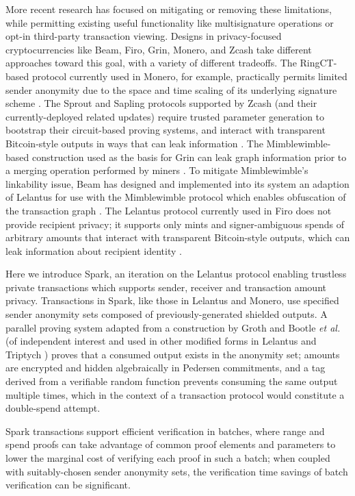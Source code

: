 \documentclass{llncs}
\begin{document}
More recent research has focused on mitigating or removing these limitations, while permitting existing useful functionality like multisignature operations or opt-in third-party transaction viewing.
Designs in privacy-focused cryptocurrencies like Beam, Firo, Grin, Monero, and Zcash take different approaches toward this goal, with a variety of different tradeoffs.
The RingCT-based protocol currently used in Monero, for example, practically permits limited sender anonymity due to the space and time scaling of its underlying signature scheme \cite{ringct,clsag}.
The Sprout and Sapling protocols supported by Zcash \cite{zcash} (and their currently-deployed related updates) require trusted parameter generation to bootstrap their circuit-based proving systems, and interact with transparent Bitcoin-style outputs in ways that can leak information \cite{zcash_sprout,zcash_sapling}.
The Mimblewimble-based construction used as the basis for Grin can leak graph information prior to a merging operation performed by miners \cite{mw}.
To mitigate Mimblewimble's linkability issue, Beam has designed and implemented into its system an adaption of Lelantus for use with the Mimblewimble protocol which enables obfuscation of the transaction graph \cite{LMW}.
The Lelantus protocol currently used in Firo does not provide recipient privacy; it supports only mints and signer-ambiguous spends of arbitrary amounts that interact with transparent Bitcoin-style outputs, which can leak information about recipient identity \cite{lelantus}.

Here we introduce Spark, an iteration on the Lelantus protocol enabling trustless private transactions which supports sender, receiver and transaction amount privacy.
Transactions in Spark, like those in Lelantus and Monero, use specified sender anonymity sets composed of previously-generated shielded outputs.
A parallel proving system adapted from a construction by Groth and Bootle \textit{et al.} \cite{groth,bootle} (of independent interest and used in other modified forms in Lelantus\cite{lelantus} and Triptych \cite{triptych}) proves that a consumed output exists in the anonymity set; amounts are encrypted and hidden algebraically in Pedersen commitments, and a tag derived from a verifiable random function \cite{dodis,omniring} prevents consuming the same output multiple times, which in the context of a transaction protocol would constitute a double-spend attempt.

Spark transactions support efficient verification in batches, where range and spend proofs can take advantage of common proof elements and parameters to lower the marginal cost of verifying each proof in such a batch; when coupled with suitably-chosen sender anonymity sets, the verification time savings of batch verification can be significant.
\end{document}
